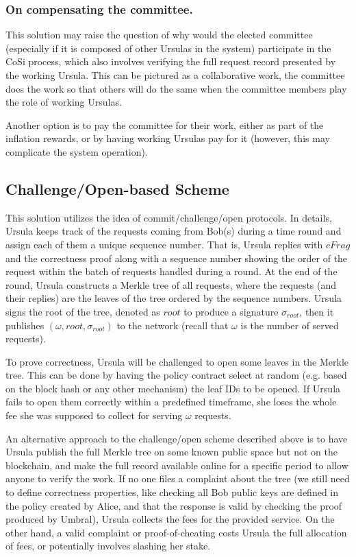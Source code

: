 \subsubsection{On compensating the committee.} This solution may 
raise the question of why would the elected committee (especially if it 
is composed of other Ursulas in the system) participate in the CoSi 
process, which also involves verifying the full request record presented 
by the working Ursula. This can be pictured as a collaborative
work, the committee does the work so that others will do the same
when the committee members play the role of working Ursulas.


Another option is to pay the committee for their work, either as
part of the inflation rewards, or by having working Ursulas pay for 
it (however, this may complicate the system operation).


\subsection{Challenge/Open-based Scheme}
This solution utilizes the idea of commit/challenge/open protocols. 
In details, Ursula keeps track of the requests coming from Bob(s) 
during a time round and assign each of them a unique sequence 
number. That is, Ursula replies with $cFrag$ and the correctness proof 
along with a sequence number showing the order of the request within 
the batch of requests handled during a round. At the end of the round, 
Ursula constructs a Merkle tree of all requests, where 
the requests (and their replies) are the leaves of the tree ordered by the sequence
numbers. Ursula signs the root of the tree, denoted as $root$ to produce 
a signature $\sigma_{root}$, then it publishes $(\omega, root, \sigma_{root})$ 
to the network (recall that $\omega$ is the number of served requests). 


To prove correctness, Ursula will be challenged to open some leaves in the Merkle tree. 
This can be done by having the policy contract select at random (e.g. based
on the block hash or any other mechanism) the leaf IDs to be opened. If 
Ursula fails to open them correctly within a predefined timeframe, she loses the 
whole fee she was supposed to collect for serving $\omega$ requests.


An alternative approach to the challenge/open scheme described above is to 
have Ursula publish the full Merkle tree on some known public space but
not on the blockchain, and make the full record available online for a specific period
to allow anyone to verify the work. If no one files a complaint about the tree (we
still need to define correctness properties, like checking all Bob public keys are 
defined in the policy created by Alice, and that the response is valid by checking the 
proof produced by Umbral), Ursula collects the fees for the provided service. On the other
hand, a valid complaint or proof-of-cheating costs Ursula the full allocation of fees, or potentially involves slashing her stake.